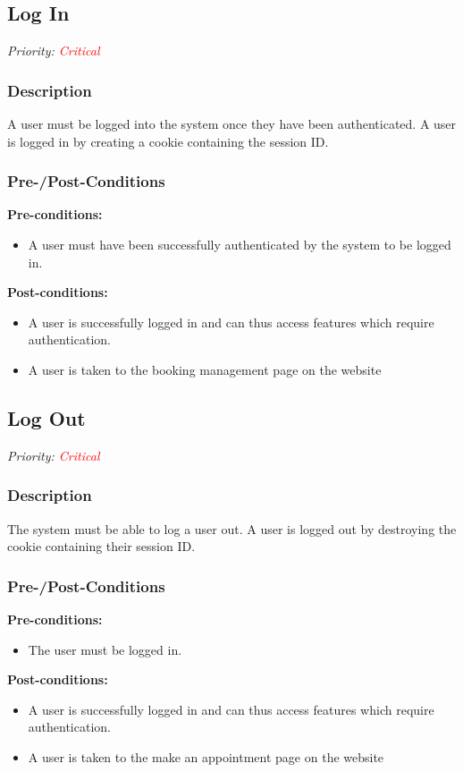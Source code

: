 \subsection{Log In}	
\textit{Priority: \textcolor{red}{Critical}} 

\subsubsection{Description}
A user must be logged into the system once they have been authenticated. A user is logged in by creating a cookie containing the session ID. \\

\subsubsection{Pre-/Post-Conditions}
	\textbf{Pre-conditions:} 
	\begin{itemize}
		\item A user must have been successfully authenticated by the system to be logged in.
	\end{itemize}
	\textbf{Post-conditions:} 
	\begin{itemize}
		\item A user is successfully logged in and can thus access features which require authentication.
		\item A user is taken to the booking management page on the website
	\end{itemize}
	
\subsection{Log Out}	
\textit{Priority: \textcolor{red}{Critical}} 
\subsubsection{Description}
The system must be able to log a user out. A user is logged out by destroying the cookie containing their session ID.\\

\subsubsection{Pre-/Post-Conditions}
	\textbf{Pre-conditions:} 
	\begin{itemize}
		\item The user must be logged in.
	\end{itemize}
	\textbf{Post-conditions:} 
	\begin{itemize}
		\item A user is successfully logged in and can thus access features which require authentication.
		\item A user is taken to the make an appointment page on the website
	\end{itemize}


